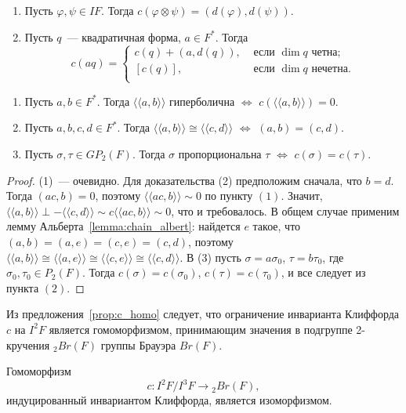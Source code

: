 \documentclass[a4paper,oneside,12pt]{article}
\theoremstyle{plain} { \swapnumbers
\newtheorem{theorem}{Теорема}[subsection]
\newtheorem{corollary}[theorem]{Следствие}
\newtheorem{lemma}[theorem]{Лемма}
\newtheorem{proposition}[theorem]{Утверждение}
\newtheorem{claim}[theorem]{Факт}
}
\theoremstyle{definition} { \swapnumbers
\newtheorem{definition}[theorem]{Определение}
\newtheorem{notation}[theorem]{Обозначение}
\newtheorem{remark}[theorem]{Замечание}
\newtheorem{remarks}[theorem]{Замечания}
\newtheorem{example}[theorem]{Пример}
\newtheorem{examples}[theorem]{Примеры}
\newtheorem{sssection}[theorem]{}
}
\def\ph{\varphi}
\def\la{\langle}
\def\ra{\rangle}
\def\lla{\la\!\la}
\def\rra{\ra\!\ra}
\begin{document}
\begin{proposition}\label{prop:c_otimes}
\begin{enumerate}
\item Пусть $\ph,\psi\in IF$. Тогда $c(\ph\otimes\psi)=(d(\ph),d(\psi))$.
\item Пусть $q$~--- квадратичная форма, $a\in F^*$. Тогда
$$
c(aq)=\begin{cases}
c(q)+(a,d(q)),&\text{ если $\dim q$ четна};\\
[c(q)],&\text{ если $\dim q$ нечетна}.\\
\end{cases}
$$
\end{enumerate}
\end{proposition}


\begin{lemma}
\begin{enumerate}
\item Пусть $a,b\in F^*$. Тогда $\lla a,b\rra$ гиперболична $\Longleftrightarrow$
$c(\lla a,b\rra)=0$.
\item Пусть $a,b,c,d\in F^*$. Тогда $\lla a,b\rra\cong\lla c,d\rra$ $\Longleftrightarrow$ $(a,b)=(c,d)$.
\item Пусть $\sigma,\tau\in GP_2(F)$. Тогда  $\sigma$ пропорциональна $\tau$ $\Longleftrightarrow$ $c(\sigma)=c(\tau)$.
\end{enumerate}
\end{lemma}
\begin{proof}
(1)~--- очевидно.
Для доказательства (2) предположим сначала, что $b=d$. Тогда $(ac,b)=0$, поэтому $\lla ac,b\rra\sim 0$ по пункту $(1)$.
Значит, $\lla a,b\rra\perp -\lla c,d\rra\sim c\lla ac,b\rra\sim 0$, что и требовалось. В общем случае применим
лемму Альберта~\ref{lemma:chain_albert}: найдется $e$ такое, что $(a,b)=(a,e)=(c,e)=(c,d)$, поэтому
$\lla a,b\rra\cong\lla a,e\rra\cong\lla c,e\rra\cong\lla c,d\rra$.
В (3) пусть $\sigma=a\sigma_0$, $\tau=b\tau_0$, где $\sigma_0,\tau_0\in P_2(F)$. Тогда $c(\sigma)=c(\sigma_0)$,
$c(\tau)=c(\tau_0)$, и все следует из пункта $(2)$.
\end{proof}

Из предложения~\ref{prop:c_homo} следует, что ограничение инварианта Клиффорда $c$ на $I^2F$ является
гомоморфизмом, принимающим значения в подгруппе 2-кручения ${}_2Br(F)$ группы Брауэра $Br(F)$.
\begin{theorem}[Меркурьев]\label{thm:Merkurjev}
Гомоморфизм
$$
c\colon I^2F/I^3F\to {}_2Br(F),
$$
индуцированный инвариантом Клиффорда, является изоморфизмом.
\end{theorem}
\end{document}
